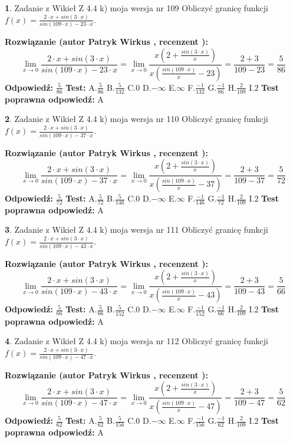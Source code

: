 \documentclass[12pt, a4paper]{article}
\theoremstyle{definition} %
\newtheorem{zad}{}
\newcommand{\zadStart}[1]{\begin{zad}#1\newline}
\newcommand{\zadStop}{\end{zad}}
\newcommand{\rozwStart}[2]{\noindent \textbf{Rozwiązanie (autor #1 , recenzent #2): }\newline}
\newcommand{\rozwStop}{\newline}
\newcommand{\odpStart}{\noindent \textbf{Odpowiedź:}\newline}
\newcommand{\odpStop}{\newline}
\newcommand{\testStart}{\noindent \textbf{Test:}\newline}
\newcommand{\testStop}{\newline}
\newcommand{\kluczStart}{\noindent \textbf{Test poprawna odpowiedź:}\newline}
\newcommand{\kluczStop}{\newline}
\begin{document}
\zadStart{Zadanie z Wikieł Z 4.4 k) moja wersja nr 109}
Obliczyć granicę funkcji $f(x)=\frac{2\cdot x +sin(3\cdot x)}{sin(109\cdot x) -23\cdot x}$.
\zadStop
\rozwStart{Patryk Wirkus}{}
$$\lim\limits_{x\to 0}\frac{2\cdot x +sin(3\cdot x)}{sin(109\cdot x) -23\cdot x}
=\lim\limits_{x\to 0}\frac{x(2+\frac{sin(3\cdot x)}{x})}{x(\frac{sin(109\cdot x)}{x}-23)}
=\frac{2+3}{109-23} = \frac{5}{86}$$
\rozwStop
\odpStart
$\frac{5}{86}$
\odpStop
\testStart
A.$\frac{5}{86}$
B.$\frac{5}{132}$
C.$0$
D.$-\infty$
E.$\infty$
F.$\frac{-1}{132}$
G.$\frac{-1}{86}$
H.$\frac{2}{109}$
I.$2$
\testStop
\kluczStart
A
\kluczStop



\zadStart{Zadanie z Wikieł Z 4.4 k) moja wersja nr 110}
Obliczyć granicę funkcji $f(x)=\frac{2\cdot x +sin(3\cdot x)}{sin(109\cdot x) -37\cdot x}$.
\zadStop
\rozwStart{Patryk Wirkus}{}
$$\lim\limits_{x\to 0}\frac{2\cdot x +sin(3\cdot x)}{sin(109\cdot x) -37\cdot x}
=\lim\limits_{x\to 0}\frac{x(2+\frac{sin(3\cdot x)}{x})}{x(\frac{sin(109\cdot x)}{x}-37)}
=\frac{2+3}{109-37} = \frac{5}{72}$$
\rozwStop
\odpStart
$\frac{5}{72}$
\odpStop
\testStart
A.$\frac{5}{72}$
B.$\frac{5}{146}$
C.$0$
D.$-\infty$
E.$\infty$
F.$\frac{-1}{146}$
G.$\frac{-1}{72}$
H.$\frac{2}{109}$
I.$2$
\testStop
\kluczStart
A
\kluczStop



\zadStart{Zadanie z Wikieł Z 4.4 k) moja wersja nr 111}
Obliczyć granicę funkcji $f(x)=\frac{2\cdot x +sin(3\cdot x)}{sin(109\cdot x) -43\cdot x}$.
\zadStop
\rozwStart{Patryk Wirkus}{}
$$\lim\limits_{x\to 0}\frac{2\cdot x +sin(3\cdot x)}{sin(109\cdot x) -43\cdot x}
=\lim\limits_{x\to 0}\frac{x(2+\frac{sin(3\cdot x)}{x})}{x(\frac{sin(109\cdot x)}{x}-43)}
=\frac{2+3}{109-43} = \frac{5}{66}$$
\rozwStop
\odpStart
$\frac{5}{66}$
\odpStop
\testStart
A.$\frac{5}{66}$
B.$\frac{5}{152}$
C.$0$
D.$-\infty$
E.$\infty$
F.$\frac{-1}{152}$
G.$\frac{-1}{66}$
H.$\frac{2}{109}$
I.$2$
\testStop
\kluczStart
A
\kluczStop



\zadStart{Zadanie z Wikieł Z 4.4 k) moja wersja nr 112}
Obliczyć granicę funkcji $f(x)=\frac{2\cdot x +sin(3\cdot x)}{sin(109\cdot x) -47\cdot x}$.
\zadStop
\rozwStart{Patryk Wirkus}{}
$$\lim\limits_{x\to 0}\frac{2\cdot x +sin(3\cdot x)}{sin(109\cdot x) -47\cdot x}
=\lim\limits_{x\to 0}\frac{x(2+\frac{sin(3\cdot x)}{x})}{x(\frac{sin(109\cdot x)}{x}-47)}
=\frac{2+3}{109-47} = \frac{5}{62}$$
\rozwStop
\odpStart
$\frac{5}{62}$
\odpStop
\testStart
A.$\frac{5}{62}$
B.$\frac{5}{156}$
C.$0$
D.$-\infty$
E.$\infty$
F.$\frac{-1}{156}$
G.$\frac{-1}{62}$
H.$\frac{2}{109}$
I.$2$
\testStop
\kluczStart
A
\kluczStop
\end{document}
